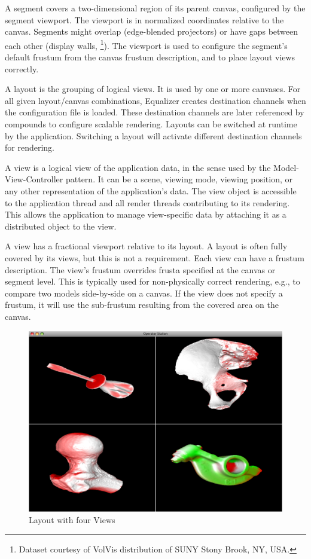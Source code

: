 A segment covers a two-dimensional region of its parent canvas, configured by
the segment viewport. The viewport is in normalized coordinates relative to the
canvas. Segments might overlap (edge-blended projectors) or have gaps between
each other (display walls, \footnote{Dataset courtesy of VolVis
distribution of SUNY Stony Brook, NY, USA.}). The viewport is used to configure
the segment's default frustum from the canvas frustum description, and to place
layout views correctly.

A \textsf{layout} is the grouping of logical views. It is used by one or more
canvases. For all given layout/canvas combinations, Equalizer creates
destination channels when the configuration file is loaded. These destination
channels are later referenced by compounds to configure scalable rendering.
Layouts can be switched at runtime by the application. Switching a layout will
activate different destination channels for rendering.

A \textsf{view} is a logical view of the application data, in the sense used by
the Model-View-Controller pattern. It can be a scene, viewing mode, viewing
position, or any other representation of the application's data. The view
object is accessible to the application thread and all render threads
contributing to its rendering. This allows the application to manage
view-specific data by attaching it as a distributed object to the view.

A view has a fractional viewport relative to its layout. A layout is often
fully covered by its views, but this is not a requirement. Each view can have a
frustum description. The view's frustum overrides frusta specified at the
canvas or segment level. This is typically used for non-physically correct
rendering, e.g., to compare two models side-by-side on a canvas. If the view
does not specify a frustum, it will use the sub-frustum resulting from the
covered area on the canvas.

\begin{figure}
 \includegraphics[width=.618\textwidth]{images/layout.png}
 {\caption{\label{fLayout}Layout with four Views}}
\end{figure}

